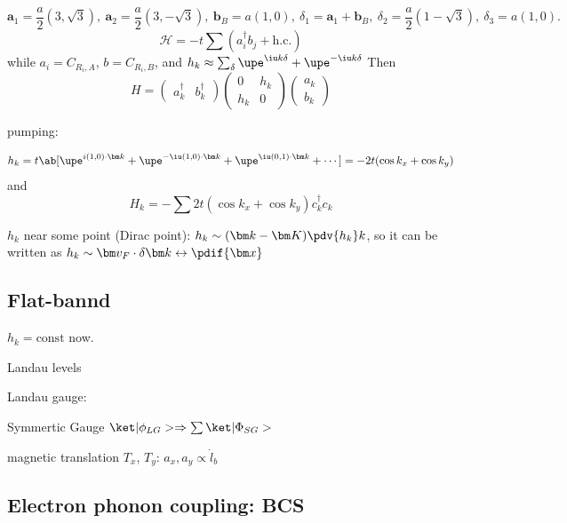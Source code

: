\begin{equation}
  \bm  a_1 = \frac a2(3,\sqrt3), ~ \bm a_2 = \frac a2(3,-\sqrt3),~
  \bm b_B = a(1,0),~ \delta_1 = \bm a_1 + \bm b_B,~ \delta_2 = \frac a2(1 - \sqrt3),~ \delta_3 = a(1,0).
\end{equation}
\begin{equation}
  \mathcal H = -t\sum (a_i^\dagger b_j + \text{h.c.})
\end{equation}
while $a_i = C_{R_i,A}$, $b = C_{R_i,B}$, and $h_k \approx \sum_\delta \upe^{\iu k\delta} + \upe^{-\iu k\delta}$
Then
\[
  H =
  \begin{pmatrix}
    a_k^\dagger & b_k^\dagger
  \end{pmatrix}
  \begin{pmatrix}
    0 & h_k\\
    h_k & 0
  \end{pmatrix}
  \begin{pmatrix}
    a_k\\b_k
  \end{pmatrix}
\]

pumping: 

\begin{equation}
  h_k = t \ab[\upe^{i(1,0) \cdot \bm k} + \upe^{-\iu(1,0) \cdot \bm k} + \upe^{\iu(0,1) \cdot \bm k} + \cdots] = -2t(\cos k_x + \cos k_y)
\end{equation}
and
\begin{equation}
  H_k = -\sum 2t(\cos k_x + \cos k_y) c_k^\dagger c_k
\end{equation}

$h_k$ near some point (Dirac point): $h_k \sim (\bm k - \bm K) \pdv{h_k}k$, so it can be written as $h_k \sim \bm v_F \cdot \delta \bm k \leftrightarrow \pdif{\bm x}$

\subsection{Flat-bannd}

$h_k = \text{const}$ now.

Landau levels

Landau gauge:

Symmertic Gauge $\ket|\phi_{LG}> \Rightarrow \sum \ket|\Phi_{SG}>$

magnetic translation $T_x$, $T_y$: $a_x, a_y \propto \dot l_b$

\subsection{Electron phonon coupling: BCS}

